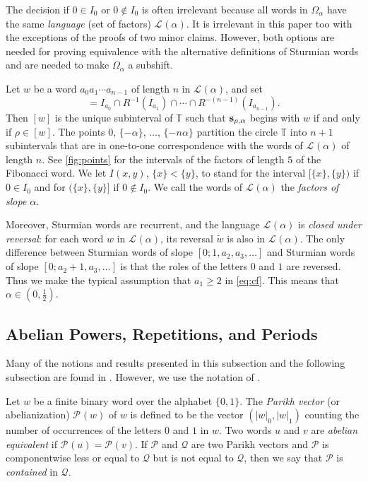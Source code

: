 \documentclass[a4paper,fleqn]{article}
\providecommand{\abs}[1]{\lvert#1\rvert}
\newcommand{\Lang}[2][]{\mathcal{L}_{#1}(#2)}
\newcommand{\infw}[1]{%
  \ifcat\noexpand#1\relax\bm{#1}%
  \else\mathbf{#1}\fi}          %
\newcommand{\mirror}[1]{\widetilde{#1}}
\newcommand{\Parikh}[2][]{\mathcal{P}_{#1}(#2)}
\newcommand{\T}{\mathbb{T}}
\begin{document}
  The decision if $0 \in I_0$ or $0 \notin I_0$ is often irrelevant because all words in $\Omega_\alpha$ have the same
  \emph{language} (set of factors) $\Lang{\alpha}$. It is irrelevant in this paper too with the exceptions of the
  proofs of two minor claims. However, both options are needed for proving equivalence with the alternative definitions
  of Sturmian words and are needed to make $\Omega_\alpha$ a subshift.

  Let $w$ be a word $a_0 a_1 \cdots a_{n-1}$ of length $n$ in $\Lang{\alpha}$, and set
  \begin{equation*}
    [w] = I_{a_0} \cap R^{-1}(I_{a_1}) \cap \cdots \cap R^{-(n-1)}(I_{a_{n-1}}).
  \end{equation*}
  Then $[w]$ is the unique subinterval of $\T$ such that $\infw{s}_{\rho,\alpha}$ begins with $w$ if and only if
  $\rho \in [w]$. The points $0$, $\{-\alpha\}$, $\ldots$, $\{-n\alpha\}$ partition the circle $\T$ into $n + 1$
  subintervals that are in one-to-one correspondence with the words of $\Lang{\alpha}$ of length $n$. See
  \autoref{fig:points} for the intervals of the factors of length $5$ of the Fibonacci word. We let $I(x, y)$,
  $\{x\} < \{y\}$, to stand for the interval $[\{x\}, \{y\})$ if $0 \in I_0$ and for $(\{x\}, \{y\}]$ if
  $0 \notin I_0$. We call the words of $\Lang{\alpha}$ the \emph{factors of slope $\alpha$}.

  Moreover, Sturmian words are recurrent, and the language $\Lang{\alpha}$ is \emph{closed under reversal}: for each
  word $w$ in $\Lang{\alpha}$, its reversal $\mirror{w}$ is also in $\Lang{\alpha}$. The only difference between
  Sturmian words of slope $[0; 1, a_2, a_3, \ldots]$ and Sturmian words of slope $[0; a_2 + 1, a_3, \ldots]$ is that
  the roles of the letters $0$ and $1$ are reversed. Thus we make the typical assumption that $a_1 \geq 2$ in
  \eqref{eq:cf}. This means that $\alpha \in (0, \tfrac12)$.

  \subsection{Abelian Powers, Repetitions, and Periods}
  Many of the notions and results presented in this subsection and the following subsection are found in
  \cite{2016:abelian_powers_and_repetitions_in_sturmian_words}. However, we use the notation of
  \cite[Ch.~4.7]{diss:jarkko_peltomaki}.

  Let $w$ be a finite binary word over the alphabet $\{0, 1\}$. The \emph{Parikh vector} (or abelianization)
  $\Parikh{w}$ of $w$ is defined to be the vector $(\abs{w}_0, \abs{w}_1)$ counting the number of occurrences of the
  letters $0$ and $1$ in $w$. Two words $u$ and $v$ are \emph{abelian equivalent} if $\Parikh{u} = \Parikh{v}$. If
  $\mathcal{P}$ and $\mathcal{Q}$ are two Parikh vectors and $\mathcal{P}$ is componentwise less or equal to
  $\mathcal{Q}$ but is not equal to $\mathcal{Q}$, then we say that $\mathcal{P}$ is \emph{contained} in $\mathcal{Q}$.
\end{document}
